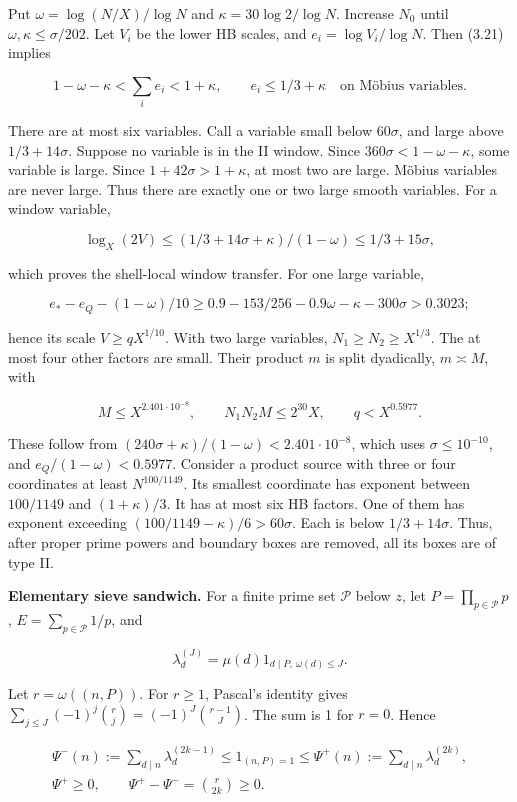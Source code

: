 Put $\omega=\log(N/X)/\log N$ and
$\kappa=30\log2/\log N$. Increase $N_0$ until
$\omega,\kappa\le\sigma/202$. Let $V_i$ be the lower HB scales, and
$e_i=\log V_i/\log N$. Then (3.21) implies

\[
1-\omega-\kappa<\sum_i e_i<1+\kappa,\qquad
e_i\le1/3+\kappa\quad\text{on Möbius variables}.
\tag{3.98}
\]

There are at most six variables.
Call a variable small below $60\sigma$, and large above $1/3+14\sigma$.
Suppose no variable is in the II window.
Since $360\sigma<1-\omega-\kappa$, some variable is large.
Since $1+42\sigma>1+\kappa$, at most two are large.
Möbius variables are never large.
Thus there are exactly one or two large smooth variables.
For a window variable,

\[
\log_X(2V)\le(1/3+14\sigma+\kappa)/(1-\omega)
       \le1/3+15\sigma,
\tag{3.99}
\]

which proves the shell-local window transfer. For one large variable,

\[
e_*-e_Q-(1-\omega)/10
 \ge0.9-153/256-0.9\omega-\kappa-300\sigma>0.3023;
\tag{3.100}
\]

hence its scale $V\ge qX^{1/10}$. With two large variables,
$N_1\ge N_2\ge X^{1/3}$. The at most four other factors are small.
Their product $m$ is split dyadically, $m\asymp M$, with

\[
M\le X^{2.401\cdot10^{-8}},\qquad N_1N_2M\le2^{30}X,\qquad q<X^{0.5977}.
\tag{3.101}
\]

These follow from
$(240\sigma+\kappa)/(1-\omega)<2.401\cdot10^{-8}$,
which uses $\sigma\le10^{-10}$,
and $e_Q/(1-\omega)<0.5977$.
Consider a product source with three or four coordinates at least $N^{100/1149}$.
Its smallest coordinate has exponent between $100/1149$ and $(1+\kappa)/3$.
It has at most six HB factors.
One of them has exponent exceeding $(100/1149-\kappa)/6>60\sigma$.
Each is below $1/3+14\sigma$.
Thus, after proper prime powers and boundary boxes are removed,
all its boxes are of type II.

\textbf{Elementary sieve sandwich.} For a finite prime set $\mathcal P$
below $z$, let $P=\prod_{p\in\mathcal P}p$,
$E=\sum_{p\in\mathcal P}1/p$, and

\[
\lambda_d^{(J)}=\mu(d)1_{d\mid P,\ \omega(d)\le J}.
\tag{3.102}
\]

Let $r=\omega((n,P))$. For $r\ge1$, Pascal's identity gives
$\sum_{j\le J}(-1)^j\binom rj=(-1)^J\binom{r-1}J$. The sum is 1 for $r=0$. Hence

\[
\begin{gathered}
\Psi^-(n):=\sum_{d\mid n}\lambda_d^{(2k-1)}
 \le1_{(n,P)=1}\le \Psi^+(n):=\sum_{d\mid n}\lambda_d^{(2k)},\\
\Psi^+\ge0,\qquad \Psi^+-\Psi^-=\binom r{2k}\ge0.
\end{gathered}
\tag{3.103}
\]

